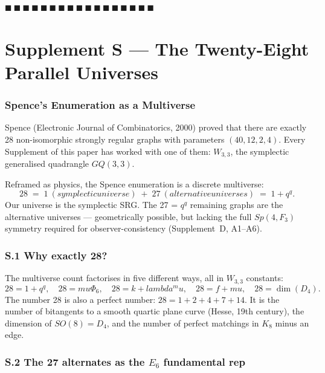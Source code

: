 \documentclass[12pt,a4paper]{article}
\def\mathbb#1{#1}%
\def\mathrm#1{#1}%
\def\textbf#1{#1}%
\def\text#1{#1}%
\def\lambda{lambda}%
\def\mu{mu}%
\def\Phi#1{Phi#1}%
\theoremstyle{definition}
\newcommand{\GQ}{\mathrm{GQ}}
\newcommand{\Sp}{\mathrm{Sp}}
\newcommand{\SO}{\mathrm{SO}}
\newcommand{\FF}{\mathbb{F}}
\begin{document}
\hfill $\blacksquare\ \blacksquare\ \blacksquare\ \blacksquare\ \blacksquare\ \blacksquare\ \blacksquare\ \blacksquare\ \blacksquare\ \blacksquare\ \blacksquare\ \blacksquare\ \blacksquare\ \blacksquare\ \blacksquare\ \blacksquare\ \blacksquare$

\clearpage
\part*{Supplement S --- The Twenty-Eight Parallel Universes}

\section*{Spence's Enumeration as a Multiverse}

Spence (Electronic Journal of Combinatorics, 2000) proved that there
are \textbf{exactly 28 non-isomorphic strongly regular graphs with
parameters $(40, 12, 2, 4)$}. Every Supplement of this paper has
worked with one of them: $W_{3,3}$, the symplectic generalised
quadrangle $\GQ(3,3)$.

Reframed as physics, the Spence enumeration is a discrete multiverse:
\[
\boxed{\;28 \;=\; 1\ \text{(symplectic universe)} \;+\; 27\ \text{(alternative universes)} \;=\; 1 + q^q.\;}
\]
Our universe is the symplectic SRG. The 27 = $q^q$ remaining graphs
are the alternative universes — geometrically possible, but lacking
the full $\Sp(4,\FF_3)$ symmetry required for observer-consistency
(Supplement~D, A1--A6).

\section*{S.1 \quad Why exactly 28?}

The multiverse count factorises in five different ways, all in
$W_{3,3}$ constants:
\[
28 = 1 + q^q,\quad 28 = \mu\Phi_6,\quad 28 = k+\lambda^\mu,\quad 28 = f+\mu,\quad 28 = \dim(D_4).
\]
The number 28 is also a perfect number: $28 = 1+2+4+7+14$. It is the
number of bitangents to a smooth quartic plane curve (Hesse, 19th
century), the dimension of $\SO(8) = D_4$, and the number of perfect
matchings in $K_8$ minus an edge.

\section*{S.2 \quad The 27 alternates as the $E_6$ fundamental rep}
\end{document}
